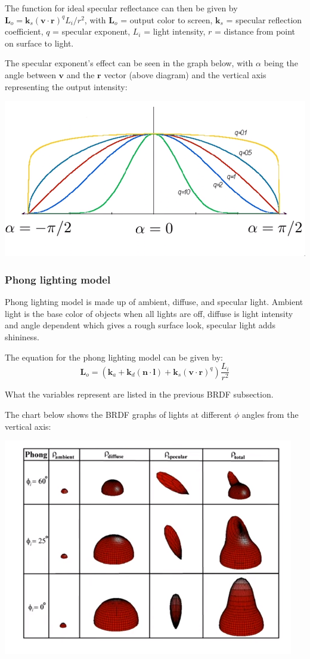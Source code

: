 \documentclass[12pt]{article}
\begin{document}
The function for ideal specular reflectance can then be given by
$\bm L_o = \bm k_s (\bm v \cdot \bm r)^q L_i/r^2$, with $\bm L_o$
= output color to screen, $\bm k_s$ = specular reflection coefficient,
$q$ = specular exponent, $L_i$ = light intensity, $r$ = distance
from point on surface to light.

The specular exponent's effect can be seen in the graph below, with $\alpha$
being the angle between $\bm v$ and the $\bm r$ vector (above diagram)
and the vertical axis representing the output intensity:

\includegraphics[scale=.5]{images/specular-exponent-graph.png}

\subsubsection{Phong lighting model}

Phong lighting model is made up of ambient, diffuse, and specular
light. Ambient light is the base color of objects when all lights
are off, diffuse is light intensity and angle dependent
which gives a rough surface look, specular light adds shininess.

The equation for the phong lighting model can be given by:
\[
    \bm L_o = \left(\bm k_a + \bm k_d(\bm n \cdot \bm l) + \bm k_s
    (\bm v \cdot \bm r)^q\right) \frac{L_i}{r^2}
\]

What the variables represent are listed in the previous BRDF subsection.

The chart below shows the BRDF graphs of lights at different $\phi$
angles from the vertical axis:

\includegraphics{images/phong-brdf-shapes.png}
\end{document}
